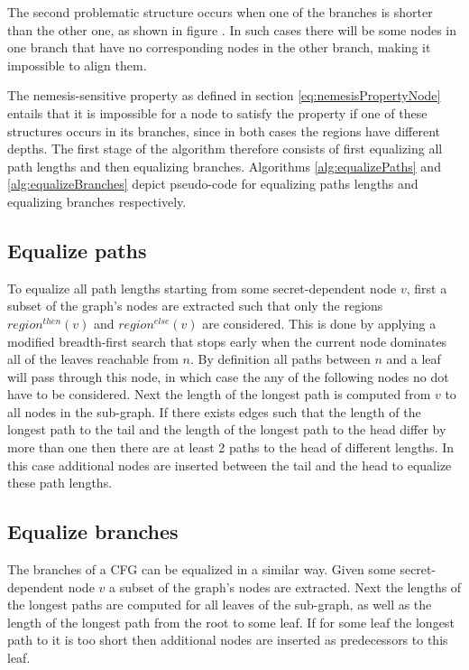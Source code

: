 The second problematic structure occurs when one of the branches is shorter than the other one, as shown in figure \label{fig:unequal}. In such cases there will be some nodes in 
one branch that have no corresponding nodes in the other branch, making it impossible to align them. 

The nemesis-sensitive property as defined in section \ref{eq:nemesisPropertyNode} entails that it is impossible for a node to satisfy the property if one of these 
structures occurs in its branches, since in both cases the regions have different depths. The first stage of the algorithm therefore consists of first equalizing all path lengths and then 
equalizing branches. Algorithms \ref{alg:equalizePaths} and \ref{alg:equalizeBranches} depict pseudo-code for equalizing paths lengths and equalizing branches respectively. 

\subsection{Equalize paths}
To equalize all path lengths starting from some secret-dependent node $v$, first a subset of the graph's nodes are extracted such that 
only the regions $region^{then}(v)$ and $region^{else}(v)$ are considered. This is done by applying a modified breadth-first search that stops early when the 
current node dominates all of the leaves reachable from $n$. By definition all paths between $n$ and a leaf will pass through this node, in which case the 
any of the following nodes no dot have to be considered. Next the length of the longest path is computed  from $v$ to all nodes in the sub-graph. 
If there exists edges such that the length of the longest path to the tail and the length of the longest path to the head differ by more than one then 
there are at least 2 paths to the head of different lengths. In this case additional nodes are inserted between the tail and the head to equalize these path lengths. 

\subsection{Equalize branches}
The branches of a CFG can be equalized in a similar way. Given some secret-dependent node $v$ a subset of the graph's nodes are extracted. 
Next the lengths of the longest paths are computed for all leaves of the sub-graph, as well as the length of the longest path from the root to some leaf. 
If for some leaf the longest path to it is too short then additional nodes are inserted as predecessors to this leaf. 

